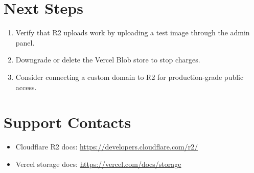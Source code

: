 \documentclass[10pt]{article}
\begin{document}
\section*{Next Steps}

\begin{enumerate}[leftmargin=*]
  \item Verify that R2 uploads work by uploading a test image through the admin panel.
  \item Downgrade or delete the Vercel Blob store to stop charges.
  \item Consider connecting a custom domain to R2 for production-grade public access.
\end{enumerate}

\section*{Support Contacts}

\begin{itemize}[leftmargin=*]
  \item Cloudflare R2 docs: \url{https://developers.cloudflare.com/r2/}
  \item Vercel storage docs: \url{https://vercel.com/docs/storage}
\end{itemize}
\end{document}
